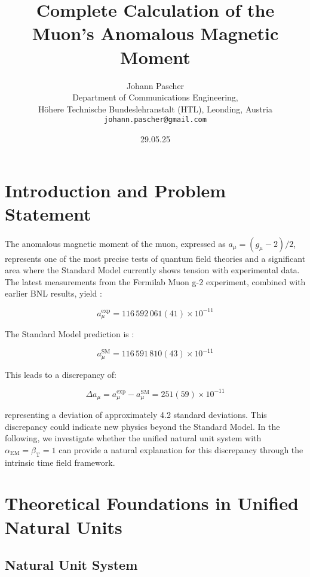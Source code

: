\documentclass[12pt,a4paper]{article}
\title{Complete Calculation of the Muon's Anomalous Magnetic Moment}
\author{Johann Pascher\\
	Department of Communications Engineering, \\Höhere Technische Bundeslehranstalt (HTL), Leonding, Austria\\
	\texttt{johann.pascher@gmail.com}}
\date{29.05.25}
\newcommand{\alphaEM}{\alpha_{\text{EM}}}
\newcommand{\betaT}{\beta_{\text{T}}}
\begin{document}
	
	\maketitle
	
	\tableofcontents
	\newpage
	
	\section{Introduction and Problem Statement}
	
	The anomalous magnetic moment of the muon, expressed as $a_\mu = (g_\mu-2)/2$, represents one of the most precise tests of quantum field theories and a significant area where the Standard Model currently shows tension with experimental data. The latest measurements from the Fermilab Muon g-2 experiment, combined with earlier BNL results, yield \cite{Muong-2:2021ojo}:
	
	\begin{equation}
		a_\mu^{\text{exp}} = 116\,592\,061(41) \times 10^{-11}
	\end{equation}
	
	The Standard Model prediction is \cite{Aoyama2020}:
	
	\begin{equation}
		a_\mu^{\text{SM}} = 116\,591\,810(43) \times 10^{-11}
	\end{equation}
	
	This leads to a discrepancy of:
	
	\begin{equation}
		\Delta a_\mu = a_\mu^{\text{exp}} - a_\mu^{\text{SM}} = 251(59) \times 10^{-11}
	\end{equation}
	
	representing a deviation of approximately 4.2 standard deviations. This discrepancy could indicate new physics beyond the Standard Model. In the following, we investigate whether the unified natural unit system with $\alphaEM = \betaT = 1$ can provide a natural explanation for this discrepancy through the intrinsic time field framework.
	
	\section{Theoretical Foundations in Unified Natural Units}
	
	\subsection{Natural Unit System}
	\label{subsec:natural_unit_system}
	
\end{document}
